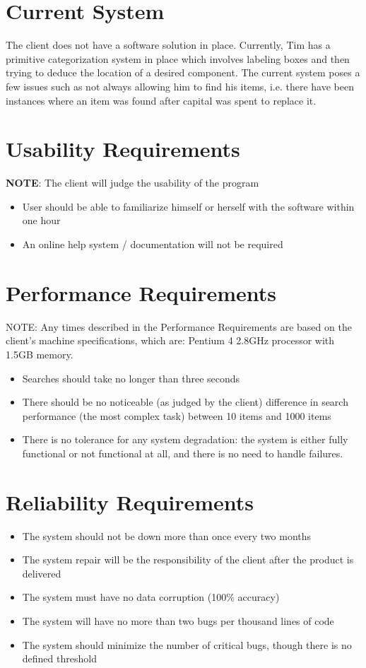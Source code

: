 \documentclass{article}
\begin{document}
\section{Current System}
The client does not have a software solution in place.  Currently, Tim has a primitive categorization system in place which involves labeling boxes and then trying to deduce the location of a desired component.  The current system poses a few issues such as not always allowing him to find his items, i.e. there have been instances where an item was found after capital was spent to replace it.

\section{Usability Requirements}
\label{usability}
\textbf{NOTE}: The client will judge the usability of the program
\begin{itemize}
\item User should be able to familiarize himself or herself with the software within one hour
\item An online help system / documentation will not be required
\end{itemize}

\section{Performance Requirements}
\label{performance}
NOTE: Any times described in the Performance Requirements are based on the client's machine specifications, which are: Pentium 4 2.8GHz processor with 1.5GB memory.
\begin{itemize}
\item Searches should take no longer than three seconds
\item There should be no noticeable (as judged by the client) difference in search performance (the most complex task) between 10 items and 1000 items
\item There is no tolerance for any system degradation: the system is either fully functional or not functional at all, and there is no need to handle failures.\label{degrad_sys}
\end{itemize}

\section{Reliability Requirements}
\label{reliability}
\begin{itemize}
\item The system should not be down more than once every two months
\item The system repair will be the responsibility of the client after the product is delivered
\item The system must have no data corruption (100\% accuracy)\label{data_corruption}
\item The system will have no more than two bugs per thousand lines of code\label{bug}
\item The system should minimize the number of critical bugs, though there is no defined threshold
\end{itemize}
\end{document}
